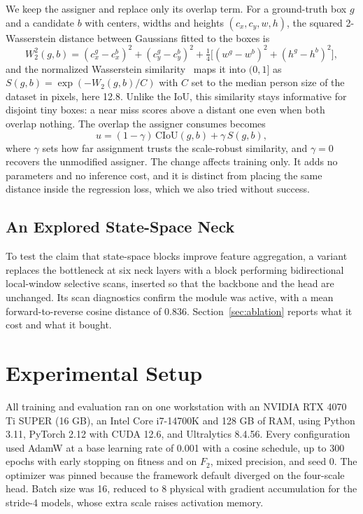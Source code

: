 \documentclass[conference,a4paper]{IEEEtran}
\begin{document}
We keep the assigner and replace only its overlap term. For a ground-truth box
$g$ and a candidate $b$ with centers, widths and heights $(c_x, c_y, w, h)$, the
squared 2-Wasserstein distance between Gaussians fitted to the boxes is
\begin{equation}
  W_2^2(g,b) = (c_{x}^{g}\!-\!c_{x}^{b})^2 + (c_{y}^{g}\!-\!c_{y}^{b})^2
    + \tfrac{1}{4}\big[(w^{g}\!-\!w^{b})^2 + (h^{g}\!-\!h^{b})^2\big],
\end{equation}
and the normalized Wasserstein similarity~\cite{wang2021nwd} maps it into
$(0,1]$ as $S(g,b) = \exp(-W_2(g,b)/C)$ with $C$ set to the median person size
of the dataset in pixels, here 12.8. Unlike the IoU, this similarity stays
informative for disjoint tiny boxes: a near miss scores above a distant one even
when both overlap nothing. The overlap the assigner consumes becomes
\begin{equation}
  u = (1-\gamma)\,\mathrm{CIoU}(g,b) + \gamma\, S(g,b),
  \label{eq:blend}
\end{equation}
where $\gamma$ sets how far assignment trusts the scale-robust similarity, and
$\gamma = 0$ recovers the unmodified assigner. The change affects training only.
It adds no parameters and no inference cost, and it is distinct from placing the
same distance inside the regression loss, which we also tried without success.

\subsection{An Explored State-Space Neck}
To test the claim that state-space blocks improve feature aggregation, a variant
replaces the bottleneck at six neck layers with a block performing bidirectional
local-window selective scans, inserted so that the backbone and the head are
unchanged. Its scan diagnostics confirm the module was active, with a mean
forward-to-reverse cosine distance of 0.836. Section~\ref{sec:ablation} reports
what it cost and what it bought.

\section{Experimental Setup}
All training and evaluation ran on one workstation with an NVIDIA RTX 4070 Ti
SUPER (16 GB), an Intel Core i7-14700K and 128 GB of RAM, using Python 3.11,
PyTorch 2.12 with CUDA 12.6, and Ultralytics 8.4.56. Every configuration used
AdamW at a base learning rate of 0.001 with a cosine schedule, up to 300 epochs
with early stopping on fitness and on $F_2$, mixed precision, and seed 0. The
optimizer was pinned because the framework default diverged on the four-scale
head. Batch size was 16, reduced to 8 physical with gradient accumulation for
the stride-4 models, whose extra scale raises activation memory.
\end{document}
